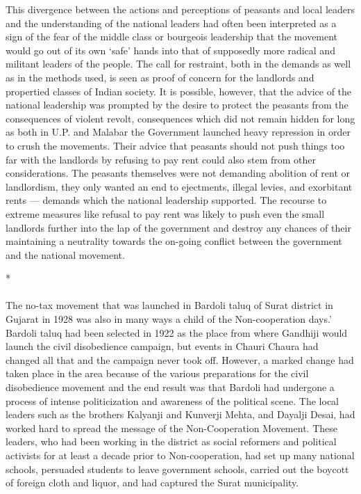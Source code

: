 \begin{multicols}{2}
This divergence between the actions and perceptions of peasants and local leaders and the understanding of the national leaders had often been interpreted as a sign of the fear of the middle class or bourgeois leadership that the movement would go out of its own `safe' hands into that of supposedly more radical and militant leaders of the people. The call for restraint, both in the demands as well as in the methods used, is seen as proof of concern for the landlords and propertied classes of Indian society. It is possible, however, that the advice of the national leadership was prompted by the desire to protect the peasants from the consequences of violent revolt, consequences which did not remain hidden for long as both in U.P. and Malabar the Government launched heavy repression in order to crush the movements. Their advice that peasants should not push things too far with the landlords by refusing to pay rent could also stem from other considerations. The peasants themselves were not demanding abolition of rent or landlordism, they only wanted an end to ejectments, illegal levies, and exorbitant rents --- demands which the national leadership supported. The recourse to extreme measures like refusal to pay rent was likely to push even the small landlords further into the lap of the government and destroy any chances of their maintaining a neutrality towards the on-going conflict between the government and the national movement.

\begin{center}*\end{center}

\paragraph*{}

The no-tax movement that was launched in Bardoli taluq of Surat district in Gujarat in 1928 was also in many ways a child of the Non-cooperation days.' Bardoli taluq had been selected in 1922 as the place from where Gandhiji would launch the civil disobedience campaign, but events in Chauri Chaura had changed all that and the campaign never took off. However, a marked change had taken place in the area because of the various preparations for the civil disobedience movement and the end result was that Bardoli had undergone a process of intense politicization and awareness of the political scene. The local leaders such as the brothers Kalyanji and Kunverji Mehta, and Dayalji Desai, had worked hard to spread the message of the Non-Cooperation Movement. These leaders, who had been working in the district as social reformers and political activists for at least a decade prior to Non-cooperation, had set up many national schools, persuaded students to leave government schools, carried out the boycott of foreign cloth and liquor, and had captured the Surat municipality.


\end{multicols}
